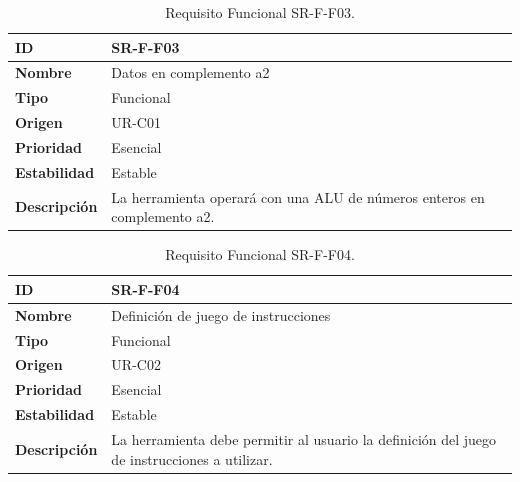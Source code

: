 \begin{center}
\begin{table}[htbp]
\centering
\begin{tabular}{@{}p{2.5cm} p{9cm}@{}} 
\toprule
\textbf{ID} 				& SR-F-F03 \\
\midrule
\textbf{Nombre} 			& Datos en complemento a2 \\
\midrule
\textbf{Tipo} 			& Funcional \\
\midrule
\textbf{Origen} 			& UR-C01 \\
\midrule
\textbf{Prioridad}		& Esencial \\
\midrule
\textbf{Estabilidad} 		& Estable \\
\midrule
\textbf{Descripción} 	& La herramienta operará con una ALU de números enteros en complemento a2. \\
\bottomrule
\end{tabular}
\caption{Requisito Funcional SR-F-F03.}
\label{tab:srff03}
\end{table}
\end{center}

\begin{center}
\begin{table}[htbp]
\centering
\begin{tabular}{@{}p{2.5cm} p{9cm}@{}} 
\toprule
\textbf{ID} 				& SR-F-F04 \\
\midrule
\textbf{Nombre} 			& Definición de juego de instrucciones \\
\midrule
\textbf{Tipo} 			& Funcional \\
\midrule
\textbf{Origen} 			& UR-C02 \\
\midrule
\textbf{Prioridad}		& Esencial \\
\midrule
\textbf{Estabilidad} 		& Estable \\
\midrule
\textbf{Descripción} 	& La herramienta debe permitir al usuario la definición del juego de instrucciones a utilizar.\\
\bottomrule
\end{tabular}
\caption{Requisito Funcional SR-F-F04.}
\label{tab:srff04}
\end{table}
\end{center}

